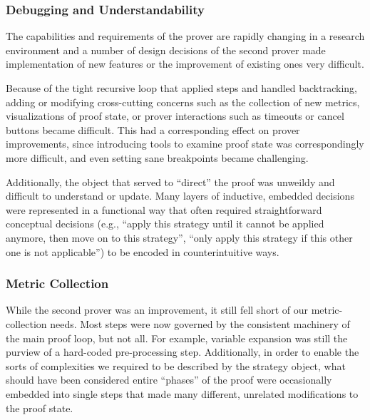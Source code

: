 		\subsubsection{Debugging and Understandability}	

The capabilities and requirements of the prover are rapidly changing in a research environment and a number of design decisions of the second prover made implementation of new features or the improvement of existing ones very difficult.

Because of the tight recursive loop that applied steps and handled backtracking, adding or modifying cross-cutting concerns such as the collection of new metrics, visualizations of proof state, or prover interactions such as timeouts or cancel buttons became difficult.  This had a corresponding effect on prover improvements, since introducing tools to examine proof state was correspondingly more difficult, and even setting sane breakpoints became challenging.

Additionally, the object that served to ``direct'' the proof was unweildy and difficult to understand or update.  Many layers of inductive, embedded decisions were represented in a functional way that often required straightforward conceptual decisions (e.g., ``apply this strategy until it cannot be applied anymore, then move on to this strategy'', ``only apply this strategy if this other one is not applicable'') to be encoded in counterintuitive ways.

		\subsubsection{Metric Collection}	

While the second prover was an improvement, it still fell short of our metric-collection needs.  Most steps were now governed by the consistent machinery of the main proof loop, but not all.  For example, variable expansion was still the purview of a hard-coded pre-processing step.  Additionally, in order to enable the sorts of complexities we required to be described by the strategy object, what should have been considered entire ``phases'' of the proof were occasionally embedded into single steps that made many different, unrelated modifications to the proof state.

